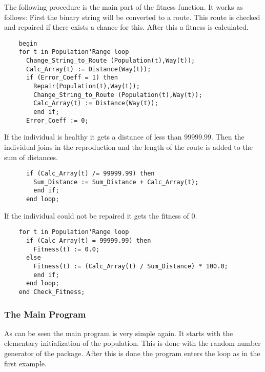 The following procedure is the main part of the fitness function. It works as
follows: First the binary string will be converted to a route. This route is
checked and repaired if there exists a chance for this. After this a fitness
is calculated.
\begin{verbatim}
    begin
    for t in Population'Range loop
      Change_String_to_Route (Population(t),Way(t));
      Calc_Array(t) := Distance(Way(t));
      if (Error_Coeff = 1) then
        Repair(Population(t),Way(t));
        Change_String_to_Route (Population(t),Way(t));
        Calc_Array(t) := Distance(Way(t));
        end if;
      Error_Coeff := 0;
\end{verbatim}
If the individual is healthy it gets a distance of less than $99999.99$. Then
the individual joins in the reproduction and the length of the route is added
to the sum of distances.
\begin{verbatim}
      if (Calc_Array(t) /= 99999.99) then
        Sum_Distance := Sum_Distance + Calc_Array(t);
        end if;
      end loop;
\end{verbatim}
If the individual could not be repaired it gets the fitness of 0.
\begin{verbatim}
    for t in Population'Range loop
      if (Calc_Array(t) = 99999.99) then
        Fitness(t) := 0.0;
      else
        Fitness(t) := (Calc_Array(t) / Sum_Distance) * 100.0;
        end if;
      end loop;
    end Check_Fitness;
\end{verbatim}
\subsubsection{The Main Program}
As can be seen the main program is very simple again. It starts with the elementary
initialization of the population. This is done with the random number generator
of the package. After this is done the program enters the loop as in the first
example.

